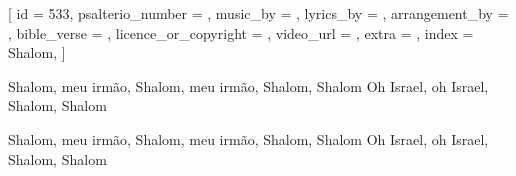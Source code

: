 % 

[
    id                     = {533},
    psalterio_number       = {},
    music_by               = {},
    lyrics_by              = {},
    arrangement_by         = {},
    bible_verse            = {},
    licence_or_copyright   = {},
    video_url              = {},
    extra                  = {},
    index                  = {Shalom},
]


\beginverse
Shalom, meu irmão, Shalom, meu irmão, Shalom, Shalom
Oh Israel, oh Israel, Shalom, Shalom
\endverse


\beginverse
Shalom, meu irmão, Shalom, meu irmão, Shalom, Shalom
Oh Israel, oh Israel, Shalom, Shalom
\endverse

\endsong
